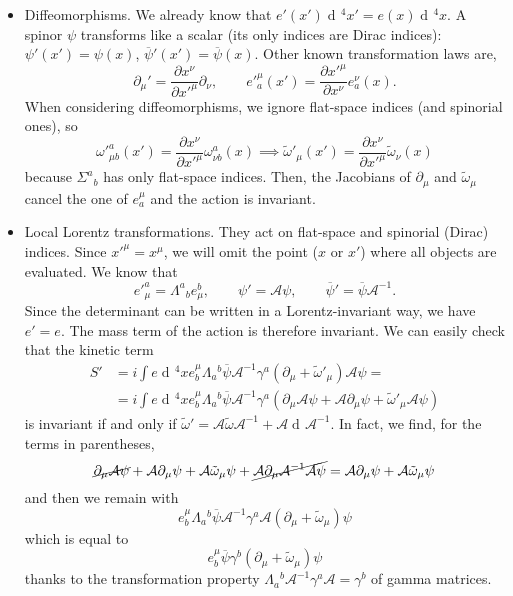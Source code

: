 \documentclass[a4paper,12pt]{book}
\newcommand{\dd}{\mathop{\mathrm{d}\!}{}}
\theoremstyle{definition}
\theoremstyle{remark}
\begin{document}
\begin{itemize}
\item Diffeomorphisms. We already know that $e'(x')\dd^4x'=e(x)\dd^4x$. A spinor $\psi$ transforms like a scalar (its only indices are Dirac indices): $\psi'(x')=\psi(x)$, $\overline\psi'(x')=\overline\psi(x)$. Other known transformation laws are,
\[\partial_\mu'=\frac{\partial x^\nu}{\partial x'^\mu}\partial_\nu,\qquad e'^\mu_a(x')=\frac{\partial x'^\mu}{\partial x^\nu}e^\nu_a(x).\]
When considering diffeomorphisms, we ignore flat-space indices (and spinorial ones), so
\[\omega'^a_{\mu b}(x')=\frac{\partial x^\nu}{\partial x'^\mu}\omega^a_{\nu b}(x)\implies\tilde\omega'_\mu(x')=\frac{\partial x^\nu}{\partial x'^\mu}\tilde\omega_\nu(x)\]
because $\Sigma^a{}_b$ has only flat-space indices.
Then, the Jacobians of $\partial_\mu$ and $\tilde\omega_\mu$ cancel the one of $e^\mu_a$ and the action is invariant.
\item Local Lorentz transformations. They act on flat-space and spinorial (Dirac) indices. Since $x'^\mu=x^\mu$, we will omit the point ($x$ or $x'$) where all objects are evaluated. We know that
\[e'^a_\mu=\Lambda^a{}_be^b_\mu,\qquad \psi'=\mathcal A\psi,\qquad\overline\psi'=\overline\psi\mathcal A^{-1}.\]
Since the determinant can be written in a Lorentz-invariant way, we have $e'=e$. The mass term of the action is therefore invariant. We can easily check that the kinetic term
\begin{align*}
S'&=i\int e\dd^4xe^\mu_b\Lambda_a{}^b\overline\psi\mathcal A^{-1}\gamma^a(\partial_\mu+\tilde\omega'_\mu)\mathcal A\psi=\\
&=i\int e\dd^4xe^\mu_b\Lambda_a{}^b\overline\psi\mathcal A^{-1}\gamma^a(\partial_\mu\mathcal A\psi+\mathcal A\partial_\mu\psi+\tilde\omega'_\mu\mathcal A\psi)
\end{align*}
is invariant if and only if $\tilde\omega'=\mathcal A\tilde\omega\mathcal A^{-1}+\mathcal A\dd \mathcal A^{-1}$. In fact, we find, for the terms in parentheses,
\[\cancel{\partial_\mu\mathcal A\psi}+\mathcal A\partial_\mu\psi+\mathcal A\tilde\omega_\mu\psi+\cancel{\mathcal A\partial_\mu\mathcal A^{-1}\mathcal A\psi}=\mathcal A\partial_\mu\psi+\mathcal A\tilde\omega_\mu\psi\]
and then we remain with
\[e^\mu_b\Lambda_a{}^b\overline\psi\mathcal A^{-1}\gamma^a\mathcal A(\partial_\mu+\tilde\omega_\mu)\psi\]
which is equal to
\[e^\mu_b\overline\psi\gamma^b(\partial_\mu+\tilde\omega_\mu)\psi\]
thanks to the transformation property $\Lambda_a{}^b\mathcal A^{-1}\gamma^a\mathcal A=\gamma^b$ of gamma matrices.


\end{itemize}
\end{document}
